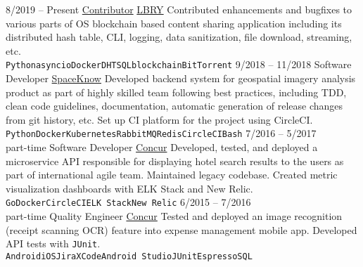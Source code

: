 \documentclass[9pt]{developercv} %
\begin{document}
\begin{entrylist}
	\entry
		{8/2019 -- Present}
        {\href{https://github.com/lbryio/lbry-sdk/pulls?utf8=\%E2\%9C\%93\&q=is\%3Apr+author\%3Amirgee+}{Contributor}}
        {\href{https://github.com/lbryio/lbry-sdk/pulls?utf8=\%E2\%9C\%93\&q=is\%3Apr+author\%3Amirgee+}{LBRY}}
        {
          Contributed enhancements and bugfixes to various parts of OS blockchain based content sharing application including its distributed hash table, CLI, logging, data sanitization, file download, streaming, etc.\\
          \texttt{Python}\slashsep\texttt{asyncio}\slashsep\texttt{Docker}\slashsep\texttt{DHT}\slashsep\texttt{SQL}\slashsep\texttt{blockchain}\slashsep\texttt{BitTorrent}}
	\entry
		{9/2018 -- 11/2018}
		{Software Developer}
        {\href{https://spaceknow.com/}{SpaceKnow}}
        {Developed backend system for geospatial imagery analysis product as part of highly skilled team following best practices, including TDD, clean code guidelines, documentation, automatic generation of release changes from git history, etc. Set up CI platform for the project using CircleCI.\\
        \texttt{Python}\slashsep\texttt{Docker}\slashsep\texttt{Kubernetes}\slashsep\texttt{RabbitMQ}\slashsep\texttt{Redis}\slashsep\texttt{CircleCI}\slashsep\texttt{Bash}}
	\entry
		{7/2016 -- 5/2017\\\footnotesize{part-time}}
		{Software Developer}
        {\href{https://www.concur.com/}{Concur}}
        {Developed, tested, and deployed a microservice API responsible for displaying hotel search results to the users as part of international agile team. Maintained legacy codebase. Created metric visualization dashboards with ELK Stack and New Relic. \\ 
        \texttt{Go}\slashsep\texttt{Docker}\slashsep\texttt{CircleCI}\slashsep\texttt{ELK Stack}\slashsep\texttt{New Relic}}
	\entry
        {6/2015 -- 7/2016\\\footnotesize{part-time}}
		{Quality Engineer}
        {\href{https://www.concur.com/}{Concur}}
        {Tested and deployed an image recognition (receipt scanning OCR) feature into expense management mobile app. Developed API tests with \texttt{JUnit}.\\
          \texttt{Android}\slashsep\texttt{iOS}\slashsep\texttt{Jira}\slashsep\texttt{XCode}\slashsep\texttt{Android Studio}\slashsep\texttt{JUnit}\slashsep\texttt{Espresso}\slashsep\texttt{SQL}}
\end{entrylist}
\end{document}
